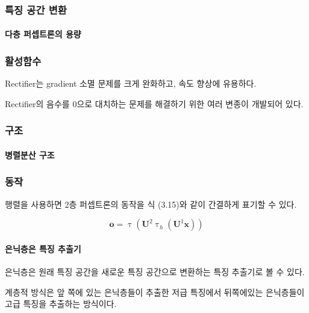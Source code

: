 \documentclass [12pt] {oblivoir}
\let\oldsubsubsection=\subsubsection
\renewcommand{\subsubsection}
{
  \filbreak
  \oldsubsubsection
}
\begin{document}
\subsubsection{특징 공간 변환}

\paragraph*{다층 퍼셉트론의 용량}\mbox{}

\vspace{3mm}

\subsubsection{활성함수}

Rectifier는 gradient 소멸 문제를 크게 완화하고, 속도 향상에 유용하다.

Rectifier의 음수를 0으로 대치하는 문제를 해결하기 위한 여러 변종이 개발되어 있다.

\subsubsection{구조}

\paragraph*{병렬분산 구조}\mbox{}

\vspace{3mm}

\subsubsection{동작}

행렬을 사용하면 2층 퍼셉트론의 동작을 식 (3.15)와 같이 간결하게 표기할 수 있다.

\begin{equation} \tag{3.15}
  \mathbf{o} = \uptau(\mathbf{U}^{2}\uptau_{h}(\mathbf{U}^{1}\mathbf{x}))
\end{equation}

\paragraph*{은닉층은 특징 추출기}\mbox{}

은닉층은 원래 특징 공간을 새로운 특징 공간으로 변환하는 특징 추출기로 볼 수 있다.

계층적 방식은 앞 쪽에 있는 은닉층들이 추출한 저급 특징에서 뒤쪽에있는 은닉층들이 고급 특징을 추출하는 방식이다.
\end{document}
